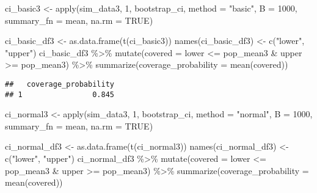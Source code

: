 \documentclass[
]{article}
\newenvironment{Shaded}{\begin{snugshade}}{\end{snugshade}}
\newcommand{\AttributeTok}[1]{\textcolor[rgb]{0.77,0.63,0.00}{#1}}
\newcommand{\ConstantTok}[1]{\textcolor[rgb]{0.00,0.00,0.00}{#1}}
\newcommand{\DecValTok}[1]{\textcolor[rgb]{0.00,0.00,0.81}{#1}}
\newcommand{\FunctionTok}[1]{\textcolor[rgb]{0.00,0.00,0.00}{#1}}
\newcommand{\NormalTok}[1]{#1}
\newcommand{\OtherTok}[1]{\textcolor[rgb]{0.56,0.35,0.01}{#1}}
\newcommand{\SpecialCharTok}[1]{\textcolor[rgb]{0.00,0.00,0.00}{#1}}
\newcommand{\StringTok}[1]{\textcolor[rgb]{0.31,0.60,0.02}{#1}}
\begin{document}
\begin{Shaded}
\begin{Highlighting}[]
\NormalTok{ci\_basic3 }\OtherTok{\textless{}{-}} \FunctionTok{apply}\NormalTok{(sim\_data3, }\DecValTok{1}\NormalTok{, bootstrap\_ci, }\AttributeTok{method =} \StringTok{"basic"}\NormalTok{, }\AttributeTok{B =} \DecValTok{1000}\NormalTok{, }\AttributeTok{summary\_fn =}\NormalTok{ mean, }\AttributeTok{na.rm =} \ConstantTok{TRUE}\NormalTok{)}

\NormalTok{ci\_basic\_df3 }\OtherTok{\textless{}{-}} \FunctionTok{as.data.frame}\NormalTok{(}\FunctionTok{t}\NormalTok{(ci\_basic3))}
\FunctionTok{names}\NormalTok{(ci\_basic\_df3) }\OtherTok{\textless{}{-}} \FunctionTok{c}\NormalTok{(}\StringTok{"lower"}\NormalTok{, }\StringTok{"upper"}\NormalTok{)}
\NormalTok{ci\_basic\_df3 }\SpecialCharTok{\%\textgreater{}\%} \FunctionTok{mutate}\NormalTok{(}\AttributeTok{covered =}\NormalTok{ lower }\SpecialCharTok{\textless{}=}\NormalTok{ pop\_mean3 }\SpecialCharTok{\&}\NormalTok{ upper }\SpecialCharTok{\textgreater{}=}\NormalTok{ pop\_mean3) }\SpecialCharTok{\%\textgreater{}\%}
  \FunctionTok{summarize}\NormalTok{(}\AttributeTok{coverage\_probability =} \FunctionTok{mean}\NormalTok{(covered))}
\end{Highlighting}
\end{Shaded}

\begin{verbatim}
##   coverage_probability
## 1                0.845
\end{verbatim}

\begin{Shaded}
\begin{Highlighting}[]
\NormalTok{ci\_normal3 }\OtherTok{\textless{}{-}} \FunctionTok{apply}\NormalTok{(sim\_data3, }\DecValTok{1}\NormalTok{, bootstrap\_ci, }\AttributeTok{method =} \StringTok{"normal"}\NormalTok{, }\AttributeTok{B =} \DecValTok{1000}\NormalTok{, }\AttributeTok{summary\_fn =}\NormalTok{ mean, }\AttributeTok{na.rm =} \ConstantTok{TRUE}\NormalTok{)}

\NormalTok{ci\_normal\_df3 }\OtherTok{\textless{}{-}} \FunctionTok{as.data.frame}\NormalTok{(}\FunctionTok{t}\NormalTok{(ci\_normal3))}
\FunctionTok{names}\NormalTok{(ci\_normal\_df3) }\OtherTok{\textless{}{-}} \FunctionTok{c}\NormalTok{(}\StringTok{"lower"}\NormalTok{, }\StringTok{"upper"}\NormalTok{)}
\NormalTok{ci\_normal\_df3 }\SpecialCharTok{\%\textgreater{}\%} \FunctionTok{mutate}\NormalTok{(}\AttributeTok{covered =}\NormalTok{ lower }\SpecialCharTok{\textless{}=}\NormalTok{ pop\_mean3 }\SpecialCharTok{\&}\NormalTok{ upper }\SpecialCharTok{\textgreater{}=}\NormalTok{ pop\_mean3) }\SpecialCharTok{\%\textgreater{}\%}
  \FunctionTok{summarize}\NormalTok{(}\AttributeTok{coverage\_probability =} \FunctionTok{mean}\NormalTok{(covered))}
\end{Highlighting}
\end{Shaded}
\end{document}
